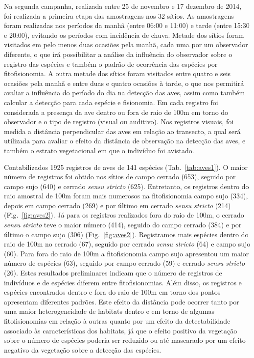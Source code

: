 \documentclass[12pt, A4]{article}
\begin{document}
Na segunda campanha, realizada entre 25 de novembro e 17 dezembro de
2014, foi realizada a primeira etapa das amostragens nos 32 sítios. 
As amostragens foram realizadas nos períodos da manhã (entre 06:00 e
11:00) e tarde (entre 15:30 e 20:00), evitando os períodos com
incidência de chuva. Metade dos sítios foram visitados em
pelo menos duas ocasiões pela manhã, cada uma por um observador
diferente, o que irá possibilitar a análise da influência do
observador sobre o registro das espécies e também o
padrão de ocorrência das espécies por fitofisionomia. A outra metade
dos sítios foram visitados entre quatro e seis ocasiões pela manhã e
entre duas e quatro ocasiões à tarde, o que nos permitirá avaliar a
influência do período do dia na detecção das aves, assim como também
calcular a detecção para cada espécie e fisionomia. Em cada registro
foi considerada a presença da ave dentro ou fora de raio de 100m em torno do observador
e o tipo de registro (visual ou auditivo). Nos registros visuais, foi
medida a distância perpendicular das aves em relação ao
transecto, a qual será utilizada para avaliar o efeito da distância de
observação na detecção das aves, e também o estrato vegetacional em que o
indivíduo foi avistado. 

Contabilizados 1925 registros de aves de 141 espécies (Tab.~\ref{tab:aves1}).
O maior número de
registros foi obtido nos sítios de campo cerrado (653), seguido
por campo sujo (640) e cerrado \textit{sensu stricto}
(625). Entretanto, os
registros dentro do raio amostral de 100m foram mais numerosos na
fitofisionomia campo sujo (334), depois em campo cerrado (269) e por
último em cerrado \textit{sensu stricto} (214) (Fig.~\ref{fig:aves2}). 
Já para os
registros realizados fora do raio de 100m,
o cerrado \textit{sensu stricto} teve o maior número (414), 
seguido do campo cerrado (384) e
por último o campo sujo (306) (Fig.~\ref{fig:aves2}). 
Registramos mais espécies dentro do raio de 100m no
cerrado (67), seguido por cerrado \textit{sensu stricto} (64) e campo
sujo (60). Para fora do raio de 100m 
a fitofisionomia campo sujo apresentou um maior número de espécies (63), seguido por campo
cerrado (59) e cerrado \textit{sensu stricto} (26).
Estes resultados preliminares indicam que o número de registros de indivíduos e de espécies
diferem entre fitofisionomias. Além disso, 
os registros e espécies encontrados dentro e fora do raio de 100m
em torno dos pontos apresentam diferentes padrões. Este efeito da
distância pode ocorrer tanto por uma maior heterogeneidade de habitats
dentro e em torno de algumas fitofisionomias em relação à outras quanto por um
efeito da detectabilidade associado às características dos habitats,
já que o efeito positivo da vegetação sobre o número de espécies
poderia ser reduzido ou até mascarado por um efeito negativo da
vegetação sobre a detecção das espécies.
\end{document}
